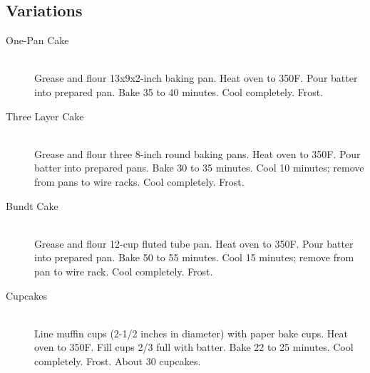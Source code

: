 \subsection{Variations}
\begin{description}
    \item[One-Pan Cake] \hfill \\
        Grease and flour 13x9x2-inch baking pan. Heat oven to 350F. Pour batter into prepared pan. Bake 35 to 40 minutes. Cool completely. Frost.
    \item[Three Layer Cake]  \hfill \\
        Grease and flour three 8-inch round baking pans. Heat oven to 350F. Pour batter into prepared pans. Bake 30 to 35 minutes. Cool 10 minutes; remove from pans to wire racks. Cool completely. Frost.
    \item[Bundt Cake]  \hfill \\
        Grease and flour 12-cup fluted tube pan. Heat oven to 350F. Pour batter into prepared pan. Bake 50 to 55 minutes. Cool 15 minutes; remove from pan to wire rack. Cool completely. Frost.
    \item[Cupcakes]  \hfill \\
        Line muffin cups (2-1/2 inches in diameter) with paper bake cups. Heat oven to 350F. Fill cups 2/3 full with batter. Bake 22 to 25 minutes. Cool completely. Frost. About 30 cupcakes.
\end{description}
